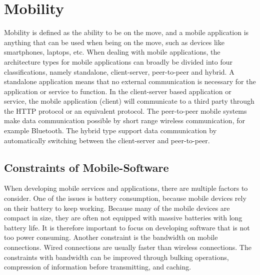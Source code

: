 \section{Mobility}
Mobility is defined as the ability to be on the move, and a mobile application is anything that can be used when being on the move, such as devices like smartphones, laptops, etc. When dealing with mobile applications, the architecture types for mobile applications can broadly be divided into four classifications, namely standalone, client-server, peer-to-peer and hybrid. A standalone application means that no external communication is necessary for the application or service to function. In the client-server based application or service, the mobile application (client) will communicate to a third party through the HTTP protocol or an equivalent protocol. The peer-to-peer mobile systems make data communication possible by short range wireless communication, for example Bluetooth. The hybrid type support data communication by automatically switching between the client-server and peer-to-peer.\cite{mallick2003mobile}

\subsection{Constraints of Mobile-Software}
When developing mobile services and applications, there are multiple factors to consider. One of the issues is battery consumption, because mobile devices rely on their battery to keep working. Because many of the mobile devices are compact in size, they are often not equipped with massive batteries with long battery life. It is therefore important to focus on developing software that is not too power consuming. Another constraint is the bandwidth on mobile connections. Wired connections are usually faster than wireless connections. The constraints with bandwidth can be improved through bulking operations, compression of information before transmitting, and caching.\cite{mobileconstraints}

